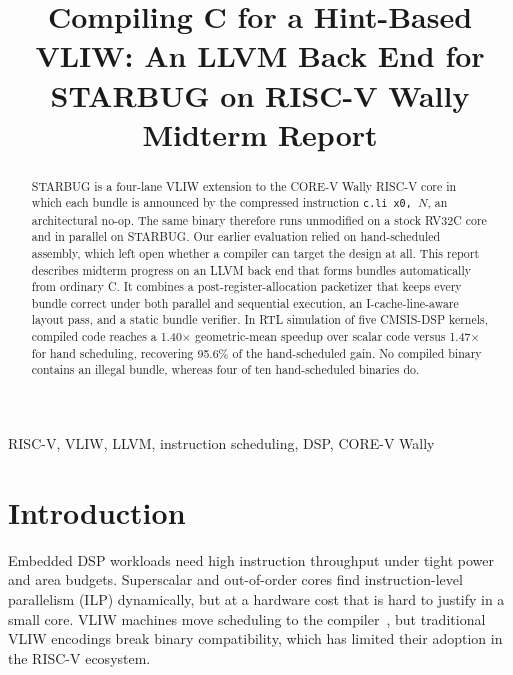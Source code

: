 \documentclass[conference]{IEEEtran}
\newcommand{\hint}{\texttt{c.li x0,\,$N$}}
\begin{document}
\title{Compiling C for a Hint-Based VLIW: An LLVM Back End for STARBUG on RISC-V Wally\\
{\large Midterm Report}}

\author{
}

\maketitle

\begin{abstract}
STARBUG is a four-lane VLIW extension to the CORE-V Wally RISC-V core in which each bundle is announced by the compressed instruction \hint, an architectural no-op. The same binary therefore runs unmodified on a stock RV32C core and in parallel on STARBUG. Our earlier evaluation relied on hand-scheduled assembly, which left open whether a compiler can target the design at all. This report describes midterm progress on an LLVM back end that forms bundles automatically from ordinary C. It combines a post-register-allocation packetizer that keeps every bundle correct under both parallel and sequential execution, an I-cache-line-aware layout pass, and a static bundle verifier. In RTL simulation of five CMSIS-DSP kernels, compiled code reaches a 1.40$\times$ geometric-mean speedup over scalar code versus 1.47$\times$ for hand scheduling, recovering 95.6\% of the hand-scheduled gain. No compiled binary contains an illegal bundle, whereas four of ten hand-scheduled binaries do.
\end{abstract}

\begin{IEEEkeywords}
RISC-V, VLIW, LLVM, instruction scheduling, DSP, CORE-V Wally
\end{IEEEkeywords}

\section{Introduction}
Embedded DSP workloads need high instruction throughput under tight power and area budgets. Superscalar and out-of-order cores find instruction-level parallelism (ILP) dynamically, but at a hardware cost that is hard to justify in a small core. VLIW machines move scheduling to the compiler~\cite{fisher-vliw-1983}, but traditional VLIW encodings break binary compatibility, which has limited their adoption in the RISC-V ecosystem.
\end{document}
